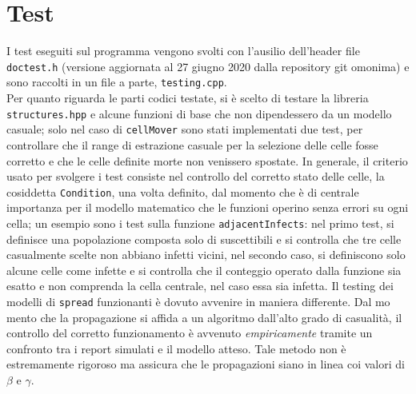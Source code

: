 \documentclass[a4paper]{article}
\begin{document}
\section{Test}
I test eseguiti sul programma vengono svolti con l'ausilio dell'header file \texttt{doctest.h} (versione aggiornata al 27 giugno 2020 dalla repository git omonima) e sono raccolti in un file a parte, \texttt{testing.cpp}.\\
Per quanto riguarda le parti codici testate, si è scelto di testare la libreria \texttt{structures.hpp} e alcune funzioni di base che non dipendessero da un modello casuale; solo nel caso di \texttt{cellMover} sono stati  implementati due test, per controllare che il range di estrazione casuale per la selezione delle celle fosse corretto e che le celle definite morte non venissero spostate. 
In generale, il criterio usato per svolgere i test consiste nel controllo del corretto stato delle celle, la cosiddetta \texttt{Condition}, una volta definito, dal momento che è di centrale importanza per il modello matematico che le funzioni operino senza errori su ogni cella; un esempio sono i test sulla funzione \texttt{adjacentInfects}: nel primo  test, si definisce una popolazione composta solo di suscettibili e si controlla che tre celle casualmente scelte non abbiano infetti vicini, nel secondo caso, si definiscono solo alcune celle come infette e si controlla che il conteggio operato dalla funzione sia esatto e non comprenda la cella centrale, nel caso essa sia infetta.
Il testing dei modelli di \texttt{spread} funzionanti è dovuto avvenire in maniera differente. Dal mo mento che la propagazione si affida a un algoritmo dall'alto grado di casualità, il controllo del corretto funzionamento è  avvenuto \textit{empiricamente} tramite un confronto tra i report simulati e il modello atteso. Tale metodo non è estremamente rigoroso ma assicura che le propagazioni siano in linea coi valori di $\beta$ e $\gamma$.
 
\end{document}
